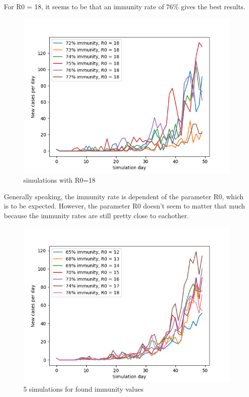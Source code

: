 \documentclass[runningheads]{llncs}
\begin{document}
For R0 = 18, it seems to be that an immunity rate of 76\%  gives the best results.
\begin{figure}
	\includegraphics[width=\textwidth]{test_R0_18.png}
	\caption{simulations with R0=18}
\end{figure}

\newpage
\noindent

Generally speaking, the immunity rate is dependent of the parameter R0, which is to be expected. However, the parameter R0 doesn't seem to matter that much because the immunity rates are still pretty close to eachother.

\begin{figure}
	\includegraphics[width=\textwidth]{test_R0_final.png}
	\caption{5 simulations for found immunity values} 
\end{figure}
\end{document}
